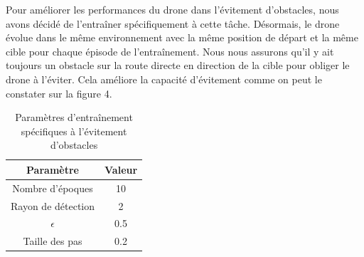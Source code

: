 \documentclass[a4paper, 12pt]{article}
\begin{document}
Pour améliorer les performances du drone dans l'évitement d'obstacles, nous avons décidé de l'entraîner spécifiquement à cette tâche. Désormais, le drone évolue dans le même environnement avec la même position de départ et la même cible pour chaque épisode de l'entraînement. Nous nous assurons qu'il y ait toujours un obstacle sur la route directe en direction de la cible pour obliger le drone à l'éviter. Cela améliore la capacité d'évitement comme on peut le constater sur la figure 4.
\begin{table}[H]
    \centering
    \begin{tabular}{|c|c|}
        \hline
        \textbf{Paramètre} & \textbf{Valeur} \\
        \hline
        Nombre d'époques & 10 \\
        Rayon de détection & 2 \\
        $\epsilon$ & 0.5 \\
        Taille des pas & 0.2 \\
        \hline
    \end{tabular}
    \caption{Paramètres d'entraînement spécifiques à l'évitement d'obstacles}
    \label{tab:training-parameters}
\end{table}
\end{document}
